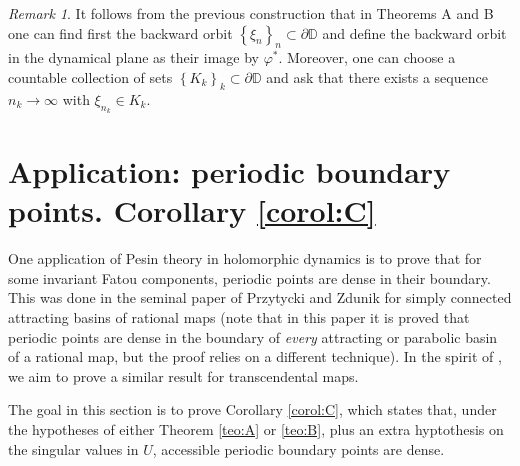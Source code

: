 \documentclass[11pt]{article}
\theoremstyle{definition}
\theoremstyle{remark}
\newtheorem*{remark*}{Remark}
\theoremstyle{plain}
\begin{document}
\begin{remark*}\label{remark-phi-star}
	It follows from the previous construction that in Theorems A and B one can find first the backward orbit $ \left\lbrace \xi_n\right\rbrace _n\subset\partial\mathbb{D} $ and define the backward orbit in the dynamical plane as their image by $ \varphi^* $. Moreover, one can choose a countable collection of sets $ \left\lbrace K_k\right\rbrace _k\subset\partial\mathbb{D} $ and ask that there exists a sequence $ n_k\to \infty $ with $ \xi_{n_k}\in K_k $.
\end{remark*}
\section{Application: periodic boundary points. Corollary \ref{corol:C}}\label{sect-periodic-points}

One application of Pesin theory in holomorphic dynamics is to prove that for some invariant Fatou components, periodic points are dense in their boundary. This was done in the seminal paper of Przytycki and Zdunik \cite{Przytycki-Zdunik} for simply connected attracting basins of rational maps (note that in this paper it is proved that periodic points are dense in the boundary of {\em every} attracting or parabolic basin of a rational map, but the proof relies on a different technique).  In the spirit of \cite{Jove}, we aim to prove a similar result for transcendental maps.

The goal in this section is to prove Corollary \ref{corol:C}, which states that, under the hypotheses of either Theorem \ref{teo:A} or \ref{teo:B}, plus an extra hyptothesis on the singular values in $ U $, accessible periodic boundary points are dense. 
\end{document}
